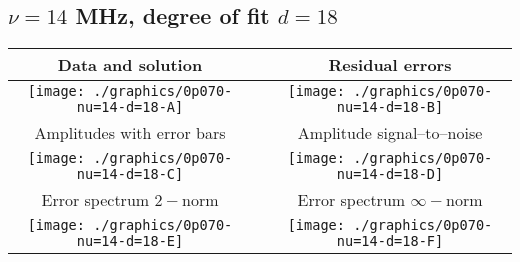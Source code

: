 

% 

\clearpage{}
\break{}

\subsection{$\nu = 14$ MHz, degree of fit $d = 18$}

\begin{table}[h]
    \begin{center}
        \begin{tabular}{ccc}
            Data and solution & \quad & Residual errors \\\hline
            \texttt{[image: ./graphics/0p070-nu=14-d=18-A]} &&
            \texttt{[image: ./graphics/0p070-nu=14-d=18-B]} \\[15pt]
            Amplitudes with error bars && Amplitude signal--to--noise \\\hline
            \texttt{[image: ./graphics/0p070-nu=14-d=18-C]} &&
            \texttt{[image: ./graphics/0p070-nu=14-d=18-D]} \\[15pt]
            Error spectrum $2-$norm && Error spectrum $\infty-$norm \\\hline
            \texttt{[image: ./graphics/0p070-nu=14-d=18-E]} &&
            \texttt{[image: ./graphics/0p070-nu=14-d=18-F]} \\[15pt]
        \end{tabular}
    \end{center}
\label{fig:elev=70, nu=14}
\end{table}



\endinput
